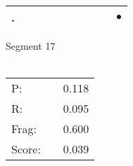 \documentclass[landscape]{article}
\newcommand{\ssp}{\hspace{2pt}}
\newcommand{\mex}{\cellcolor{g}$\bullet$}
\begin{document}
\begin{tabular}{|l|p{10pt}|p{10pt}|p{10pt}|p{10pt}|p{10pt}|p{10pt}|p{10pt}|p{10pt}|p{10pt}|}
\hline
\ssp \cellcolor{ref8}. \ssp&\hspace{2pt}&\hspace{2pt}&\hspace{2pt}&\hspace{2pt}&\hspace{2pt}&\hspace{2pt}&\hspace{2pt}&\hspace{2pt}&\hspace{2pt}\mex\\
\hline
\end{tabular}

\vspace{6pt}
\noindent Segment 17\\\\
\noindent\begin{tabular}{lm{12pt}r}
\hline
P:&&0.118\\
R:&&0.095\\
Frag:&&0.600\\
Score:&&0.039\\
\end{tabular}

\newpage
\end{document}

